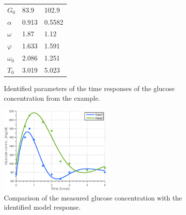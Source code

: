 \documentclass{article}
\newcommand{\figWidth}{0.5\textwidth}
\begin{document}
\begin{figure}[!h]
\begin{minipage}[t]{0.48\textwidth}
\begin{tabular}{lll}
\rowcolor{Gray}
$G_0$     			&83.9    	&102.9 \\
$\alpha$   			&0.913     	&0.5582 \\
\rowcolor{Gray}	
$\omega$       		&1.87     	&1.12 \\
$\varphi$     			&1.633     	&1.591 \\
\rowcolor{Gray}
$\omega_0$       		&2.086      	&1.251 \\
$T_0$     			&3.019     	&5.023 \\
\bottomrule
\end{tabular}
\vspace{31pt}
\caption{Identified parameters of the time responses of the glucose concentration from the example.}
\label{tabAckerParams}
	\end{minipage}
\end{figure}

\begin{figure}[h!t!]
   \centering
   \includegraphics[width=\figWidth]{figs/ackermanTest1}
	\vspace{-5pt}
   \caption{Comparison of the measured glucose concentration with the identified model response.}
   \label{Fig:ackerResult}
\end{figure}



\end{document}

